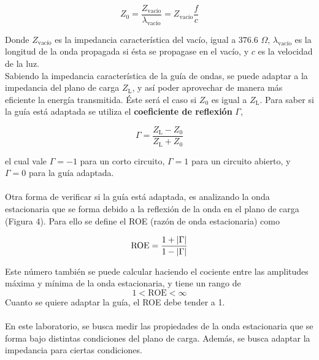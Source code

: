 \documentclass[11pt,a4paper]{article}
\DeclarePairedDelimiter\abs{\lvert}{\rvert}%
\begin{document}
\begin{multicols}{2}
\begin{equation}\label{eq:z_0}
    Z_0=\frac{Z_\text{vacío}}{\lambda_\text{vacío}}=Z_\text{vacío}\frac{f}{c}
\end{equation}

Donde $Z_\text{vacío}$ es la impedancia característica del vacío, igual a $376.6$ $\Omega$, $\lambda_\text{vacío}$ es la longitud de la onda propagada si ésta se propagase en el vacío, y $c$ es la velocidad de la luz.\\

Sabiendo la impedancia característica de la guía de ondas, se puede adaptar a la impedancia del plano de carga $Z_\text{L}$, y así poder aprovechar de manera más eficiente la energía transmitida. Éste será el caso si $Z_0$ es igual a $Z_\text{L}$. Para saber si la guía está adaptada se utiliza el \textbf{coeficiente de reflexión} $\Gamma$,

\begin{equation}\label{eq:gamma}
    \Gamma = \frac{Z_\text{L}-Z_0}{Z_\text{L}+Z_0}
\end{equation}

el cual vale $\Gamma = -1$ para un corto circuito, $\Gamma = 1$ para un circuito abierto, y $\Gamma = 0$ para la guía adaptada. \\ \\ 
Otra forma de verificar si la guía está adaptada, es analizando la onda estacionaria que se forma debido a la reflexión de la onda en el plano de carga (Figura 4).
Para ello se define el ROE (razón de onda estacionaria) como

\begin{equation}\label{eq:ROE}
    \text{ROE} = \frac{1+\abs{\Gamma}}{1-\abs{\Gamma}}
\end{equation}

Este número también se puede calcular haciendo el cociente entre las amplitudes máxima y mínima de la onda estacionaria, y tiene un rango de 
$$
1<\text{ROE} < \infty
$$
Cuanto se quiere adaptar la guía, el ROE debe tender a 1. \\ \\
En este laboratorio, se busca medir las propiedades de la onda estacionaria que se forma bajo distintas condiciones del plano de carga. Además, se busca adaptar la impedancia para ciertas condiciones. 


\end{multicols}
\end{document}
